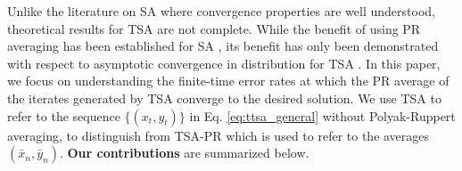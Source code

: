 Unlike the literature on SA where convergence properties are well understood, theoretical results for TSA are not complete.
While the benefit of using PR averaging has been established for SA \citep{polyakJuditsky}, its benefit has only been demonstrated with respect to asymptotic convergence in distribution for TSA \citep{mokkadem2006convergence}.
In this paper, we focus on understanding the finite-time error rates at which the PR average of the iterates generated by TSA converge to the desired solution. 
We use TSA to refer to the sequence $\{(x_t, y_t)\}$ in Eq. \eqref{eq:ttsa_general} without Polyak-Ruppert averaging, to distinguish from TSA-PR which is used to refer to the averages $(\bar{x}_n, \bar{y}_n)$. 
\textbf{Our contributions} are summarized below. 
\vspace{-0.3cm}
